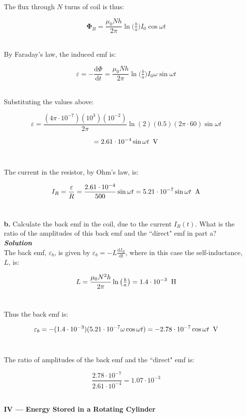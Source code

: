 \documentclass[9pt]{extarticle}
\renewcommand{\v}[1]{{\bm #1}}
\newcommand{\bfit}[1]{\textbf{\textit{#1}}}
\renewcommand{\d}{\text{d}}
\newcommand{\ddt}[1]{\frac{\d #1}{\d t}}
\newcommand{\muo}{\mu_0}
\begin{document}
\begin{multicols*}{2}
The flux through $N$ turns of coil is thus:

$$\v \Phi_B = \frac{\muo Nh}{2\pi} \ln \big( \tfrac ba \big) I_0 \cos\omega t$$ \

By Faraday's law, the induced emf is:

$$\varepsilon = -\ddt \Phi = \frac{\muo Nh}{2\pi} \ln \big( \tfrac ba \big) I_0 \omega\sin\omega t$$ \

Substituting the values above:

$$\varepsilon = \frac{(4\pi \cdot 10^{-7})(10^3)(10^{-2})}{2\pi} \ln(2) (0.5) (2\pi \cdot 60) \sin\omega t$$

$$= 2.61 \cdot 10^{-4} \sin\omega t \;\; \text V$$ \ 

The current in the resistor, by Ohm's law, is:

$$I_R = \frac \varepsilon R = \frac{2.61 \cdot 10^{-4}}{500}\sin\omega t =  5.21 \cdot 10^{-7} \sin\omega t\;\; \text A$$ \  




\dotfill 

\hfill 

{\Large \bf b.} Calculate the back emf in the coil, due to the current $I_R(t)$. What is the ratio of the amplitudes of this back emf and the ``direct" emf in part a? \\ 

{\bfit{Solution}} \\ 

The back emf, $\varepsilon_b$, is given by $\varepsilon_b = -L \ddt{I_R}$, where in this case the self-inductance, $L$, is:

$$L = \frac{\muo N^2 h}{2\pi} \ln \big( \tfrac ba \big) = 1.4 \cdot 10^{-3} \;\; \text H$$ \ 

Thus the back emf is:

$$\varepsilon_b = -(1.4 \cdot 10^{-3}) (5.21 \cdot 10^{-7} \omega\cos\omega t) = -2.78 \cdot 10^{-7}\cos\omega t\;\; \text V$$ \ 

The ratio of amplitudes of the back emf and the ``direct" emf is:

$$\frac{2.78 \cdot 10^{-7}}{2.61 \cdot 10^{-4}} = 1.07  \cdot 10^{-3}$$ \







\hrulefill 

\hfill 

{\LARGE \bf IV --- Energy Stored in a Rotating Cylinder} \\ 


\end{multicols*}
\end{document}
